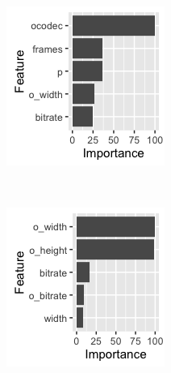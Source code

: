 \documentclass[letterpaper,12pt,titlepage,oneside,final]{report}
\begin{document}
\begin{figure}[!ht]
\begin{subfigure}[t]{0.45\textwidth}
                    \caption{}
                    \label{marsvarimp}
                \end{subfigure}
                \end{figure}
                \begin{figure}[!ht]
                \begin{subfigure}[t]{0.45\textwidth}
                    \centering
                    \includegraphics[width=\textwidth]{nnetvarimp}
                    \caption{}
                    \label{nnetvarimp}
                \end{subfigure}%
                    ~ 
                \begin{subfigure}[t]{0.45\textwidth}
                    \centering
                    \includegraphics[width=\textwidth]{knnvarimp}

\end{subfigure}
\end{figure}
\end{document}
